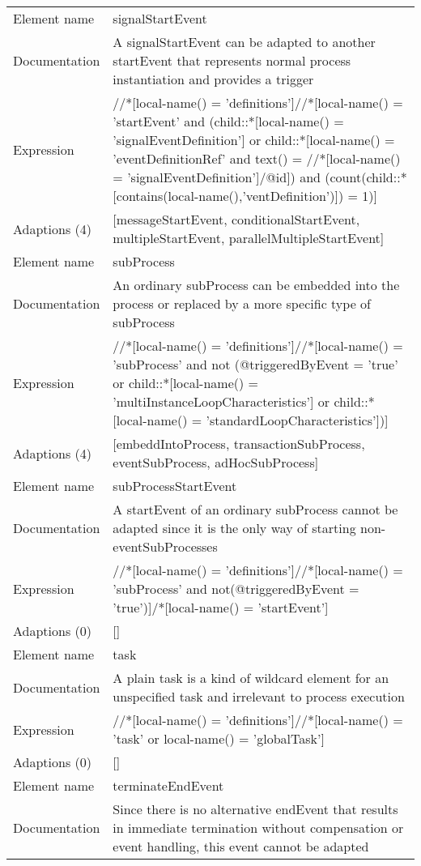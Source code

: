 \begin{center}
\begin{tiny}
\begin{longtable}{p{}|p{}}
\midrule
Element name & signalStartEvent\\
\myrowcolour
Documentation &A signalStartEvent can be adapted to another startEvent that represents normal process instantiation and provides a trigger\\
Expression & //*[local-name() = 'definitions']//*[local-name() = 'startEvent' and (child::*[local-name() = 'signalEventDefinition'] or child::*[local-name() = 'eventDefinitionRef' and text() = //*[local-name() = 'signalEventDefinition']/@id]) and (count(child::*[contains(local-name(),'ventDefinition')]) = 1)]\\
\myrowcolour
Adaptions (4) & [messageStartEvent, conditionalStartEvent, multipleStartEvent, parallelMultipleStartEvent]\\
\midrule
Element name & subProcess\\
\myrowcolour
Documentation &An ordinary subProcess can be embedded into the process or replaced by a more specific type of subProcess\\
Expression & //*[local-name() = 'definitions']//*[local-name() = 'subProcess' and not (@triggeredByEvent = 'true' or child::*[local-name() = 'multiInstanceLoopCharacteristics'] or child::*[local-name() = 'standardLoopCharacteristics'])]\\
\myrowcolour
Adaptions (4) & [embeddIntoProcess, transactionSubProcess, eventSubProcess, adHocSubProcess]\\
\midrule
Element name & subProcessStartEvent\\
\myrowcolour
Documentation &A startEvent of an ordinary subProcess cannot be adapted since it is the only way of starting non-eventSubProcesses\\
Expression & //*[local-name() = 'definitions']//*[local-name() = 'subProcess' and not(@triggeredByEvent = 'true')]/*[local-name() = 'startEvent']\\
\myrowcolour
Adaptions (0) & []\\
\midrule
Element name & task\\
\myrowcolour
Documentation &A plain task is a kind of wildcard element for an unspecified task and irrelevant to process execution\\
Expression & //*[local-name() = 'definitions']//*[local-name() = 'task' or local-name() = 'globalTask']\\
\myrowcolour
Adaptions (0) & []\\
\midrule
Element name & terminateEndEvent\\
\myrowcolour
Documentation &Since there is no alternative endEvent that results in immediate termination without compensation or event handling, this event cannot be adapted\\

\end{longtable}
\end{tiny}
\end{center}
